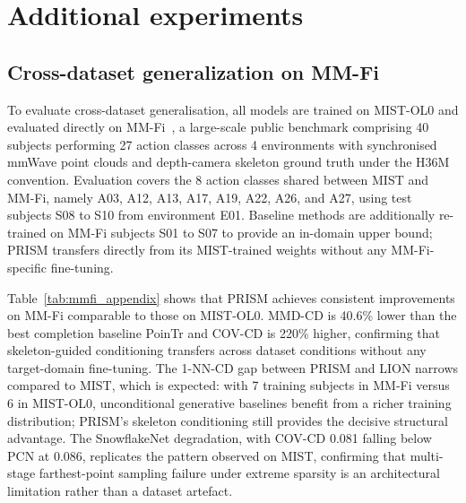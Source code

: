 \documentclass{article}
\begin{document}
\section{Additional experiments}
\label{app:additional}

\subsection{Cross-dataset generalization on MM-Fi}
\label{app:mmfi_results}

To evaluate cross-dataset generalisation, all models are trained on MIST-OL0 and
evaluated directly on MM-Fi~\cite{yang2023mmfi}, a large-scale public benchmark
comprising 40 subjects performing 27 action classes across 4 environments with
synchronised mmWave point clouds and depth-camera skeleton ground truth under the
H36M convention.
Evaluation covers the 8 action classes shared between MIST and MM-Fi, namely A03,
A12, A13, A17, A19, A22, A26, and A27, using test subjects S08 to S10 from
environment E01.
Baseline methods are additionally re-trained on MM-Fi subjects S01 to S07 to
provide an in-domain upper bound; PRISM transfers directly from its MIST-trained
weights without any MM-Fi-specific fine-tuning.

Table~\ref{tab:mmfi_appendix} shows that PRISM achieves consistent improvements
on MM-Fi comparable to those on MIST-OL0.
MMD-CD is 40.6\% lower than the best completion baseline PoinTr and COV-CD is
220\% higher, confirming that skeleton-guided conditioning transfers across dataset
conditions without any target-domain fine-tuning.
The 1-NN-CD gap between PRISM and LION narrows compared to MIST, which is expected:
with 7 training subjects in MM-Fi versus 6 in MIST-OL0, unconditional generative
baselines benefit from a richer training distribution; PRISM's skeleton conditioning
still provides the decisive structural advantage.
The SnowflakeNet degradation, with COV-CD 0.081 falling below PCN at 0.086,
replicates the pattern observed on MIST, confirming that multi-stage farthest-point
sampling failure under extreme sparsity is an architectural limitation rather than a
dataset artefact.
\end{document}
